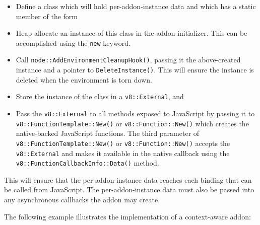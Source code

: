 \begin{itemize}
\item
  Define a class which will hold per-addon-instance data and which has a
  static member of the form

\begin{Shaded}
\begin{Highlighting}[]
 \OperatorTok{(}\OperatorTok{*}\OperatorTok{)} \OperatorTok{\{}
\OperatorTok{\}}
\end{Highlighting}
\end{Shaded}
\item
  Heap-allocate an instance of this class in the addon initializer. This
  can be accomplished using the \texttt{new} keyword.
\item
  Call \texttt{node::AddEnvironmentCleanupHook()}, passing it the
  above-created instance and a pointer to \texttt{DeleteInstance()}.
  This will ensure the instance is deleted when the environment is torn
  down.
\item
  Store the instance of the class in a \texttt{v8::External}, and
\item
  Pass the \texttt{v8::External} to all methods exposed to JavaScript by
  passing it to \texttt{v8::FunctionTemplate::New()} or
  \texttt{v8::Function::New()} which creates the native-backed
  JavaScript functions. The third parameter of
  \texttt{v8::FunctionTemplate::New()} or \texttt{v8::Function::New()}
  accepts the \texttt{v8::External} and makes it available in the native
  callback using the \texttt{v8::FunctionCallbackInfo::Data()} method.
\end{itemize}

This will ensure that the per-addon-instance data reaches each binding
that can be called from JavaScript. The per-addon-instance data must
also be passed into any asynchronous callbacks the addon may create.

The following example illustrates the implementation of a context-aware
addon:

